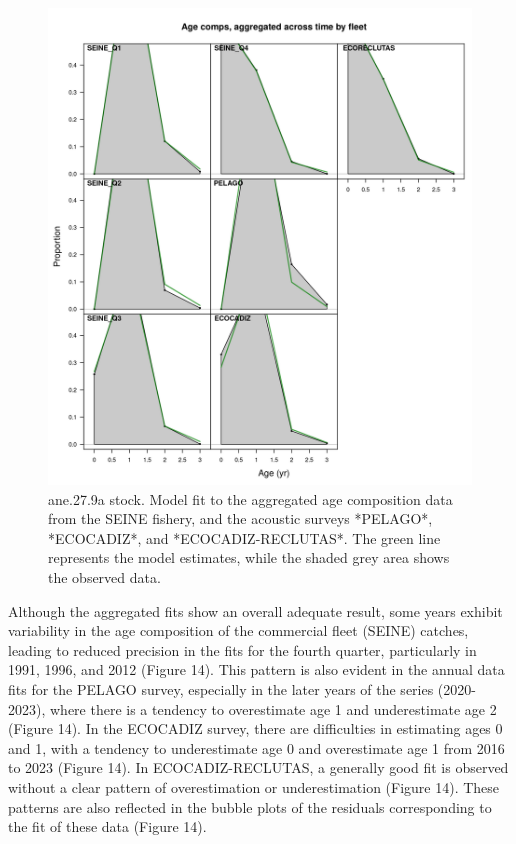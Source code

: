 \documentclass[
]{article}
\begin{document}
\begin{figure}[H]

{\centering \includegraphics[width=0.95\linewidth]{report/run/S1.0_4FLEETS/fig_age_fit_agg} 

}

\caption{ane.27.9a stock. Model fit to the aggregated age composition data from the SEINE fishery, and the acoustic surveys *PELAGO*, *ECOCADIZ*, and *ECOCADIZ-RECLUTAS*. The green line represents the model estimates, while the shaded grey area shows the observed data.}\label{fig:unnamed-chunk-18}
\end{figure}

Although the aggregated fits show an overall adequate result, some years
exhibit variability in the age composition of the commercial fleet
(SEINE) catches, leading to reduced precision in the fits for the fourth
quarter, particularly in 1991, 1996, and 2012 (Figure 14). This pattern
is also evident in the annual data fits for the PELAGO survey,
especially in the later years of the series (2020-2023), where there is
a tendency to overestimate age 1 and underestimate age 2 (Figure 14). In
the ECOCADIZ survey, there are difficulties in estimating ages 0 and 1,
with a tendency to underestimate age 0 and overestimate age 1 from 2016
to 2023 (Figure 14). In ECOCADIZ-RECLUTAS, a generally good fit is
observed without a clear pattern of overestimation or underestimation
(Figure 14). These patterns are also reflected in the bubble plots of
the residuals corresponding to the fit of these data (Figure 14).
\end{document}
